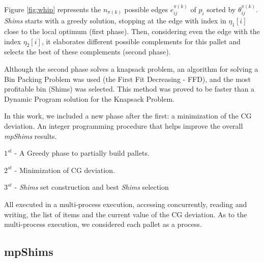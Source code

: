 \documentclass[preprint,authoryear]{elsarticle}
\begin{document}
\begin{table}[H]
\begin{minipage}{0.58\linewidth}
		\label{fig:whip}		
	\end{minipage}
\end{table}


Figure \ref{fig:whip} represents the $n_{\pi(k)}$\/ possible edges $e_{ij}^{\pi(k)}$\/ of $p_i$\/ sorted by $\theta_{ij}^{\pi(k)}$. \emph{Shims}\/ starts with a greedy solution, stopping at the edge with index in $\eta_1[i]$ close to the local optimum (first phase). Then, considering even the edge with the index $\eta_2[i]$, it elaborates different possible complements for this pallet and selects the best of these complements (second phase).

Although the second phase solves a knapsack problem, an algorithm for solving a Bin Packing Problem was used (the First Fit Decreasing - FFD), and the most profitable bin (Shims) was selected. This method was proved to be faster than a Dynamic Program solution for the Knapsack Problem.
		
	In this work, we included a new phase after the first: a minimization of the CG deviation. An integer programming procedure that helps improve the overall {\it mpShims} results.

$1^{st}$ - A Greedy phase to partially build pallets.

$2^{st}$ - Minimization of CG deviation.

$3^{st}$ - {\it Shims} set construction and best {\it Shims} selection

All executed in a multi-process execution, accessing concurrently, reading and writing, the list of items and the current value of the CG deviation.
As to the multi-process execution, we considered each pallet as a process.



\subsection{mpShims}
\end{document}
